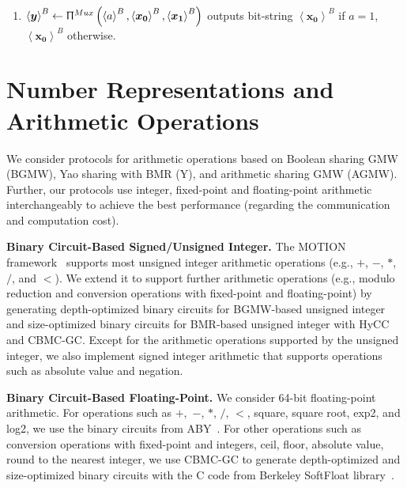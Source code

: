 \begin{enumerate}
      \item $\left\langle \boldsymbol{y}\right\rangle ^B \gets  \Uppi^{Mux}\left(\left\langle a\right\rangle^B, \left\langle \boldsymbol{x_0}\right\rangle^B ,\left\langle \boldsymbol{x_1}\right\rangle^B  \right) $ outputs bit-string $\left\langle \boldsymbol{x_0}\right\rangle^B $ if $a=1$, $\left\langle \boldsymbol{x_0}\right\rangle^B $ otherwise.

\end{enumerate}

\section{Number Representations and Arithmetic Operations}
\label{sec:NumberRepresentationsandArithmeticOperations}
We consider \smpc protocols for arithmetic operations based on Boolean sharing GMW (BGMW), Yao sharing with BMR (Y), and arithmetic sharing GMW (AGMW).
Further, our \smpc protocols use integer, fixed-point and floating-point arithmetic interchangeably to achieve the best \smpc performance (regarding the communication and computation cost).

\textbf{Binary Circuit-Based Signed/Unsigned Integer.}
The MOTION framework~\cite{braun2022motion} supports most unsigned integer arithmetic operations (e.g., $+$, $-$, $*$, $/$, and $<$). We extend it to support further arithmetic operations (e.g., modulo reduction and conversion operations with fixed-point and floating-point) by generating depth-optimized binary circuits for BGMW-based unsigned integer and size-optimized binary circuits for BMR-based unsigned integer with HyCC and CBMC-GC.
Except for the arithmetic operations supported by the unsigned integer, we also implement signed integer arithmetic that supports operations such as absolute value and negation.

\textbf{Binary Circuit-Based Floating-Point.}
We consider 64-bit floating-point arithmetic. For operations such as $+,$ $-$, $*$, $/$, $<$, square, square root, exp2, and log2, we use the binary circuits from ABY~\cite{demmler2015aby}. For other operations such as conversion operations with fixed-point and integers, ceil, floor, absolute value, round to the nearest integer, we use CBMC-GC to generate depth-optimized and size-optimized binary circuits with the C code from Berkeley SoftFloat library~\cite{BerkelySoftFloat}.


